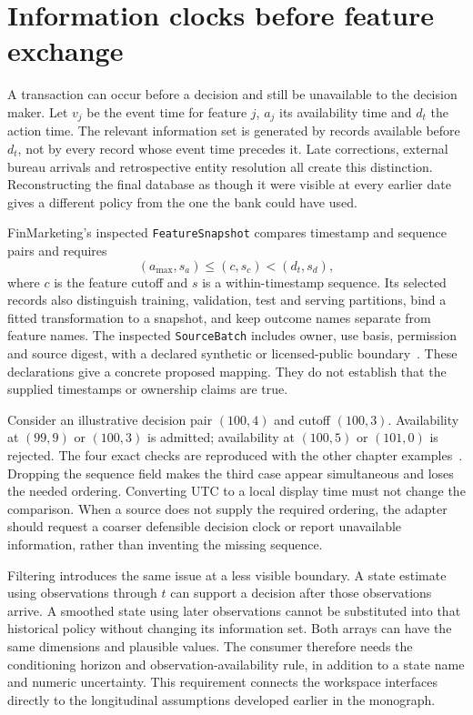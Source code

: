 \section{Information clocks before feature exchange}

A transaction can occur before a decision and still be unavailable to the
decision maker. Let $v_j$ be the event time for feature $j$, $a_j$ its
availability time and $d_t$ the action time. The relevant information set is
generated by records available before $d_t$, not by every record whose event
time precedes it. Late corrections, external bureau arrivals and retrospective
entity resolution all create this distinction. Reconstructing the final
database as though it were visible at every earlier date gives a different
policy from the one the bank could have used.

FinMarketing's inspected \texttt{FeatureSnapshot} compares timestamp and
sequence pairs and requires
\[
 (a_{\max},s_a)\leq(c,s_c)<(d_t,s_d),
\]
where $c$ is the feature cutoff and $s$ is a within-timestamp sequence.
Its selected records also distinguish training, validation, test and serving
partitions, bind a fitted transformation to a snapshot, and keep outcome
names separate from feature names. The inspected \texttt{SourceBatch}
includes owner, use basis, permission and source digest, with a declared
synthetic or licensed-public boundary~\citep{exec13_i3_inspection}. These
declarations give a concrete proposed mapping. They do not establish that
the supplied timestamps or ownership claims are true.

Consider an illustrative decision pair $(100,4)$ and cutoff $(100,3)$.
Availability at $(99,9)$ or $(100,3)$ is admitted; availability at $(100,5)$
or $(101,0)$ is rejected. The four exact checks are reproduced with the other
chapter examples~\citep{exec13_i3_examples}. Dropping the sequence field makes
the third case appear simultaneous and loses the needed ordering. Converting
UTC to a local display time must not change the comparison. When a source
does not supply the required ordering, the adapter should request a coarser
defensible decision clock or report unavailable information, rather than
inventing the missing sequence.

Filtering introduces the same issue at a less visible boundary. A state
estimate using observations through $t$ can support a decision after those
observations arrive. A smoothed state using later observations cannot be
substituted into that historical policy without changing its information
set. Both arrays can have the same dimensions and plausible values. The
consumer therefore needs the conditioning horizon and observation-availability
rule, in addition to a state name and numeric uncertainty. This requirement
connects the workspace interfaces directly to the longitudinal assumptions
developed earlier in the monograph.
